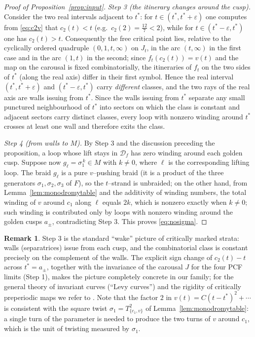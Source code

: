 \documentclass[11pt]{amsart}
\theoremstyle{plain}
\theoremstyle{definition}
\newtheorem{remark}[theorem]{Remark}
\newcommand{\D}{\mathcal{D}}
\begin{document}
\begin{proof}[Proof of Proposition~\ref{prop:input}]
\emph{Step 3 (the itinerary changes around the cusp).}  Consider the two
real intervals adjacent to $t^{*}$: for
$t\in(t^{*},t^{*}+\varepsilon)$ one computes from \eqref{eq:c2v} that
$c_2(t)<t$ (e.g.\ $c_2(2)=\tfrac{12}7<2$), while for
$t\in(t^{*}-\varepsilon,t^{*})$ one has $c_2(t)>t$.  Consequently the
free critical point lies, relative to the cyclically ordered quadruple
$(0,1,t,\infty)$ on $J_t$, in the arc $(t,\infty)$ in the first case and in
the arc $(1,t)$ in the second; since $f_t(c_2(t))=v(t)$ and the map on the
carousal is fixed combinatorially, the itineraries of $f_t$ on the two
sides of $t^{*}$ (along the real axis) differ in their first symbol.
Hence the real interval $(t^{*},t^{*}+\varepsilon)$ and
$(t^{*}-\varepsilon,t^{*})$ carry \emph{different} classes, and the two
rays of the real axis are walls issuing from $t^{*}$.
Since the walls issuing from $t^{*}$ separate any small punctured
neighbourhood of $t^{*}$ into sectors on which the class is constant and
adjacent sectors carry distinct classes, every loop with nonzero winding
around $t^{*}$ crosses at least one wall and therefore exits the class.

\emph{Step 4 (from walls to $M$).}  By Step 3 and the discussion
preceding the proposition, a loop whose lift stays in $\D_f$ has zero
winding around each golden cusp.  Suppose now $g_\ell=\sigma_1^{\,k}\in M$
with $k\ne0$, where $\ell$ is the corresponding lifting loop.  The braid
$g_\ell$ is a pure $v$--pushing braid (it is a product of the three
generators $\sigma_1,\sigma_2,\sigma_3$ of $F$), so the $t$--strand is
unbraided; on the other hand, from Lemma~\ref{lem:monodromytable} and the
additivity of winding numbers, the total winding of $v$ around $c_1$
along $\ell$ equals $2k$, which is nonzero exactly when $k\ne0$; such
winding is contributed only by loops with nonzero winding around the
golden cusps $a_\pm$, contradicting Step 3.  This proves
\eqref{eq:nosigma}.
\end{proof}

\begin{remark}
Step 3 is the standard ``wake'' picture of critically marked strata: walls
(separatrices) issue from each cusp, and the combinatorial class is
constant precisely on the complement of the walls.  The explicit sign
change of $c_2(t)-t$ across $t^{*}=a_\pm$, together with the invariance of
the carousal $J$ for the four PCF limits (Step 1), makes the picture
completely concrete in our family; for the general theory of invariant
curves (``Levy curves'') and the rigidity of critically preperiodic maps we
refer to \cite{PilgrimTan, Kiwi, Rees}.  Note that the factor $2$ in
$v(t)=C(t-t^{*})^{2}+\cdots$ is consistent with the square twist
$\sigma_1=T_{\{c_1,v\}}^2$ of Lemma~\ref{lem:monodromytable}: a single
turn of the parameter is needed to produce the two turns of $v$ around
$c_1$, which is the unit of twisting measured by $\sigma_1$.
\end{remark}
\end{document}
